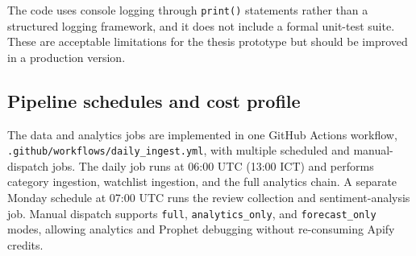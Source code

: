 The code uses console logging through \texttt{print()} statements rather
than a structured logging framework, and it does not include a formal
unit-test suite. These are acceptable limitations for the thesis
prototype but should be improved in a production version.

\subsection{Pipeline schedules and cost profile}

The data and analytics jobs are implemented in one GitHub Actions
workflow, \texttt{.github/workflows/daily\_ingest.yml}, with multiple
scheduled and manual-dispatch jobs. The daily job runs at 06:00 UTC
(13:00 ICT) and performs category ingestion, watchlist ingestion, and the
full analytics chain. A separate Monday schedule at 07:00 UTC runs the
review collection and sentiment-analysis job. Manual dispatch supports
\texttt{full}, \texttt{analytics\_only}, and \texttt{forecast\_only}
modes, allowing analytics and Prophet debugging without re-consuming
Apify credits.

\begin{table}[htbp]
  \centering
  \small
  \caption{Pipeline schedule across GitHub Actions and OpenClaw cron jobs.}
  \label{tab:schedules}
\end{table}

